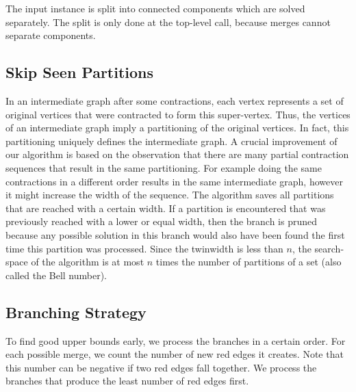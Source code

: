 \documentclass[a4paper,UKenglish,cleveref, autoref, thm-restate]{lipics-v2021}
\begin{document}
The input instance is split into connected components which are solved separately.
The split is only done at the top-level call, because merges cannot separate components.


\subsection{Skip Seen Partitions}
In an intermediate graph after some contractions, each vertex represents a set of original vertices that were contracted to form this super-vertex.
Thus, the vertices of an intermediate graph imply a partitioning of the original vertices.
In fact, this partitioning uniquely defines the intermediate graph.
A crucial improvement of our algorithm is based on the observation that there are many partial contraction sequences that result in the same partitioning.
For example doing the same contractions in a different order results in the same intermediate graph, however it might increase the width of the sequence.
The algorithm saves all partitions that are reached with a certain width.
If a partition is encountered that was previously reached with a lower or equal width, then the branch is pruned because any possible solution in this branch would also have been found the first time this partition was processed.
Since the twinwidth is less than $n$, the search-space of the algorithm is at most $n$ times the number of partitions of a set (also called the Bell number).


\subsection{Branching Strategy}
To find good upper bounds early, we process the branches in a certain order.
For each possible merge, we count the number of new red edges it creates.
Note that this number can be negative if two red edges fall together.
We process the branches that produce the least number of red edges first.
\end{document}
